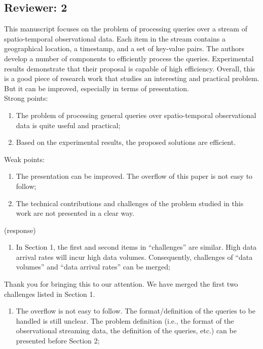 \documentclass{article}
\begin{document}
\subsection*{Reviewer: 2}\label{reviewer-2}
This manuscript focuses on the problem of processing queries over a stream of spatio-temporal observational data. Each item in the stream contains a geographical location, a timestamp, and a set of key-value pairs. The authors develop a number of components to efficiently process the queries. Experimental results demonstrate that their proposal is capable of high efficiency. Overall, this is a good piece of research work that studies an interesting and practical problem. But it can be improved, especially in terms of presentation. \\
%
Strong points:
\begin{enumerate}
    \item The problem of processing general queries over spatio-temporal observational data is quite useful and practical;
    \item Based on the experimental results, the proposed solutions are efficient.
\end{enumerate}
%
Weak points:
\begin{enumerate}
    \item The presentation can be improved. The overflow of this paper is not easy to follow;
    \item The technical contributions and challenges of the problem studied in this work are not presented in a clear way.
\end{enumerate}

\begin{tcolorbox}
(response)
\end{tcolorbox}

\begin{enumerate}
\def\labelenumi{(\arabic{enumi})}
\item
  In Section 1, the first and second items in ``challenges'' are
  similar. High data arrival rates will incur high data volumes.
  Consequently, challenges of ``data volumes'' and ``data arrival
  rates'' can be merged;
\end{enumerate}

\begin{tcolorbox}
Thank you for bringing this to our attention. We have merged the first
two challenges listed in Section 1.
\end{tcolorbox}

\begin{enumerate}
\def\labelenumi{(\arabic{enumi})}
\setcounter{enumi}{1}
\item
  The overflow is not easy to follow. The format/definition of the
  queries to be handled is still unclear. The problem definition (i.e.,
  the format of the observational streaming data, the definition of the
  queries, etc.) can be presented before Section 2;
\end{enumerate}
\end{document}
